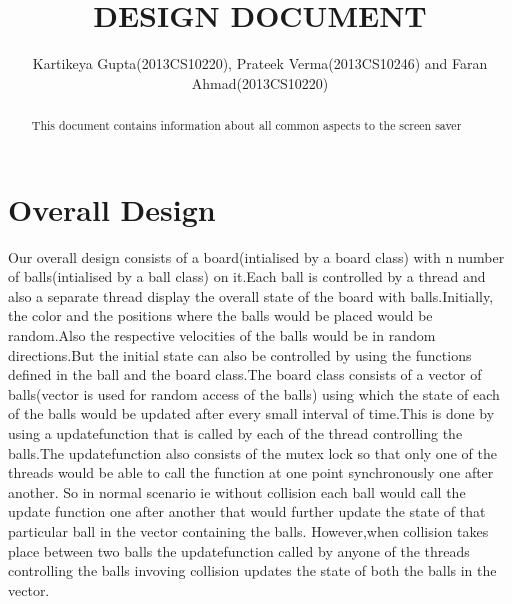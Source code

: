 \setlength{\topmargin}{-.5in}
\setlength{\textheight}{9in}
\setlength{\oddsidemargin}{.125in}
\usepackage{listings}
\usepackage{color} %

\setlength{\textwidth}{6.25in}

\title
{DESIGN DOCUMENT}
\author
{Kartikeya Gupta(2013CS10220), Prateek Verma(2013CS10246) and Faran Ahmad(2013CS10220)}
\renewcommand{\today}{January 10, 2015}
\maketitle 
\begin{abstract}
This document contains information about all common aspects to the screen saver
\end{abstract}
\pagebreak 
\section{Overall Design}
Our overall design consists of a board(intialised by a board class) with n number of balls(intialised by a ball class) on it.Each ball is controlled by a thread and also a separate thread display the overall state of the board with balls.Initially, the color and the positions where the balls would be placed would be random.Also the respective velocities of the balls would be in random directions.But the initial state can also be controlled by using the functions defined in the ball and the board class.The board class consists of a vector of balls(vector is used for random access of the balls) using which the state of each of the balls would be updated after every small interval of time.This is done by using a updatefunction that is called by each of the thread controlling the balls.The updatefunction also consists of the mutex lock so that only one of the threads would be able to call the function at one point synchronously one after another.
So in normal scenario ie without collision each ball would call the update function one after another that would further update the state of that particular ball in the vector containing the balls.
However,when collision takes place between two balls the updatefunction called by anyone of the threads controlling the balls invoving collision updates the state of both the balls in the vector.
